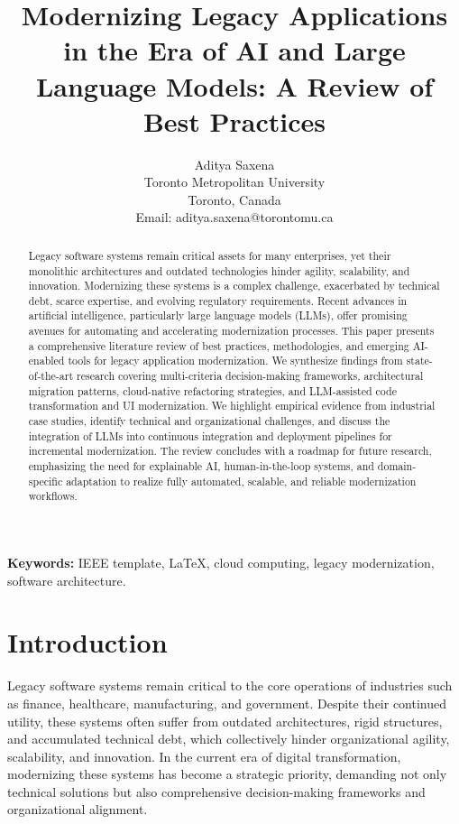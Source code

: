 \documentclass[12pt]{article}
\title{Modernizing Legacy Applications in the Era of AI and Large Language Models: A Review of Best Practices
}
\author{Aditya Saxena \\
Toronto Metropolitan University \\
Toronto, Canada \\
Email: aditya.saxena@torontomu.ca}
\begin{document}
\maketitle

\begin{abstract}
Legacy software systems remain critical assets for many enterprises, yet their monolithic architectures and outdated technologies hinder agility, scalability, and innovation. Modernizing these systems is a complex challenge, exacerbated by technical debt, scarce expertise, and evolving regulatory requirements. Recent advances in artificial intelligence, particularly large language models (LLMs), offer promising avenues for automating and accelerating modernization processes. This paper presents a comprehensive literature review of best practices, methodologies, and emerging AI-enabled tools for legacy application modernization. We synthesize findings from state-of-the-art research covering multi-criteria decision-making frameworks, architectural migration patterns, cloud-native refactoring strategies, and LLM-assisted code transformation and UI modernization. We highlight empirical evidence from industrial case studies, identify technical and organizational challenges, and discuss the integration of LLMs into continuous integration and deployment pipelines for incremental modernization. The review concludes with a roadmap for future research, emphasizing the need for explainable AI, human-in-the-loop systems, and domain-specific adaptation to realize fully automated, scalable, and reliable modernization workflows.
\end{abstract}


\textbf{Keywords:} IEEE template, LaTeX, cloud computing, legacy modernization, software architecture.

\section{Introduction}

Legacy software systems remain critical to the core operations of industries such as finance, healthcare, manufacturing, and government. Despite their continued utility, these systems often suffer from outdated architectures, rigid structures, and accumulated technical debt, which collectively hinder organizational agility, scalability, and innovation. In the current era of digital transformation, modernizing these systems has become a strategic priority, demanding not only technical solutions but also comprehensive decision-making frameworks and organizational alignment.
\end{document}
